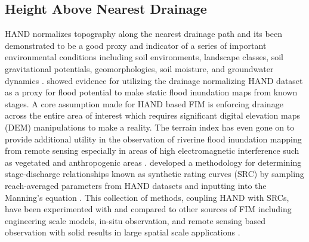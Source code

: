 \documentclass[draft]{dependencies/agujournal2019}
\begin{document}
\subsection{Height Above Nearest Drainage}
%
HAND normalizes topography along the nearest drainage path and its been demonstrated to be a good proxy and indicator of a series of important environmental conditions including soil environments, landscape classes, soil gravitational potentials, geomorphologies, soil moisture, and groundwater dynamics \cite{renno2008hand,nobre2011height}. 
 showed evidence for utilizing the drainage normalizing HAND dataset as a proxy for flood potential to make static flood inundation maps from known stages.
A core assumption made for HAND based FIM is enforcing drainage across the entire area of interest which requires significant digital elevation maps (DEM) manipulations to make a reality.
The terrain index has even gone on to provide additional utility in the observation of riverine flood inundation mapping from remote sensing especially in areas of high electromagnetic interference such as vegetated and anthropogenic areas \cite{aristizabal2020high,shastry2019using,huang2017comparison,twele2016sentinel}.
 developed a methodology for determining stage-discharge relationships known as synthetic rating curves (SRC) by sampling reach-averaged parameters from HAND datasets and inputting into the Manning's equation \cite{gauckler1867etudes,manning1890flow}.
This collection of methods, coupling HAND with SRCs, have been experimented with and compared to other sources of FIM including engineering scale models, in-situ observation, and remote sensing based observation with solid results in large spatial scale applications \cite{godbout2019error,johnson2019integrated,garousi2019terrain,nobre2016hand,afshari2018comparison,zheng2018geoflood,teng2015rapid,teng2017flood,zhang2018comparative}.
%
\end{document}
